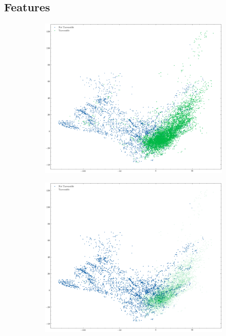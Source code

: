 \documentclass[../document.tex]{subfiles}
\begin{document}
\subsection{Features}
\begin{figure}[H]
    \centering
    \begin{subfigure}[b]{1\textwidth}
        \includegraphics[width=\linewidth]{../img/5/pca/pca-test.png}
    \end{subfigure}
    \begin{subfigure}[b]{0.48\textwidth}
        \includegraphics[width=\linewidth]{../img/5/pca/pca-test-0.png}

\end{subfigure}
\end{figure}
\end{document}
